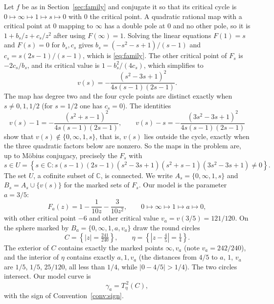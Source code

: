 \documentclass[11pt]{article}
\newcommand{\C}{\mathbb C}
\theoremstyle{remark}
\numberwithin{equation}{section}
\begin{document}
Let $f$ be as in Section~\ref{sec:family} and conjugate it so that its
critical cycle is $0\mapsto\infty\mapsto1\mapsto s\mapsto0$ with $0$ the
critical point. A quadratic rational map with a critical point at $0$
mapping to $\infty$ has a double pole at $0$ and no other pole, so it is
$1+b_s/z+c_s/z^2$ after using $F(\infty)=1$. Solving the linear equations
$F(1)=s$ and $F(s)=0$ for $b_s,c_s$ gives $b_s=(-s^2-s+1)/(s-1)$ and
$c_s=s(2s-1)/(s-1)$, which is \eqref{eq:family}. The other critical point of $F_s$ is $-2c_s/b_s$, and
its critical value is $1-b_s^2/(4c_s)$, which simplifies to
\begin{equation}\label{eq:vs}
 v(s)=-\frac{(s^2-3s+1)^2}{4s(s-1)(2s-1)} .
\end{equation}
The map has degree two and the four cycle points are distinct exactly when
$s\ne0,1,1/2$ (for $s=1/2$ one has $c_s=0$). The identities
\[
 v(s)-1=-\frac{(s^2+s-1)^2}{4s(s-1)(2s-1)},\qquad
 v(s)-s=-\frac{(3s^2-3s+1)^2}{4s(s-1)(2s-1)}
\]
show that $v(s)\notin\{0,\infty,1,s\}$, that is, $v(s)$ lies outside the
cycle, exactly when the three quadratic factors below are nonzero. So the
maps in the problem are, up to M\"obius conjugacy, precisely the $F_s$ with
\begin{equation}\label{eq:U}
 s\in U=\left\{s\in\C:
 s(s-1)(2s-1)(s^2-3s+1)(s^2+s-1)(3s^2-3s+1)\ne0\right\}.
\end{equation}
The set $U$, a cofinite subset of $\C$, is connected. We write
$A_s=\{0,\infty,1,s\}$ and $B_s=A_s\cup\{v(s)\}$ for the marked sets of
$F_s$. Our model is the parameter $a=3/5$:
\begin{equation}\label{eq:model}
 F_a(z)=1-\frac1{10z}-\frac3{10z^2},\qquad
 0\longmapsto\infty\longmapsto1\longmapsto a\longmapsto0,
\end{equation}
with other critical point $-6$ and other critical value
$v_a=v(3/5)=121/120$. On the sphere marked by
$B_a=\{0,\infty,1,a,v_a\}$ draw the round circles
\begin{equation}\label{eq:circles}
 C=\left\{|z|=\tfrac{241}{240}\right\},\qquad
 \eta=\left\{\left|z-\tfrac45\right|=\tfrac14\right\}.
\end{equation}
The exterior of $C$ contains exactly the marked points $\infty,v_a$
(note $v_a=242/240$), and the interior of $\eta$ contains exactly $a,1,v_a$
(the distances from $4/5$ to $a$, $1$, $v_a$ are $1/5$, $1/5$, $25/120$,
all less than $1/4$, while $|0-4/5|>1/4$). The two circles intersect. Our
model curve is
\begin{equation}\label{eq:answer}
 \boxed{\ \gamma_a=T_\eta^{\,2}(C),\ }
\end{equation}
with the sign of Convention~\ref{conv:sign}.
\end{document}
